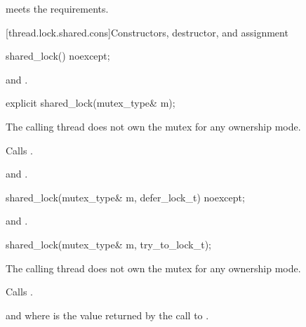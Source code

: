 \pnum
\begin{note}
 meets the 
requirements.
\end{note}

[thread.lock.shared.cons]{Constructors, destructor, and assignment}

%
\begin{itemdecl}
shared_lock() noexcept;
\end{itemdecl}

\begin{itemdescr}
\pnum
\ensures
{} and .
\end{itemdescr}

%
\begin{itemdecl}
explicit shared_lock(mutex_type& m);
\end{itemdecl}

\begin{itemdescr}
\pnum
\expects
The calling thread does not own the mutex for any ownership mode.

\pnum
\effects
Calls .

\pnum
\ensures
{} and .
\end{itemdescr}

%
\begin{itemdecl}
shared_lock(mutex_type& m, defer_lock_t) noexcept;
\end{itemdecl}

\begin{itemdescr}
\pnum
\ensures
{} and .
\end{itemdescr}

%
\begin{itemdecl}
shared_lock(mutex_type& m, try_to_lock_t);
\end{itemdecl}

\begin{itemdescr}
\pnum
\expects
The calling thread does not own the mutex for any ownership mode.

\pnum
\effects
Calls .

\pnum
\ensures
{} and 
where  is the
value returned by the call to .
\end{itemdescr}

